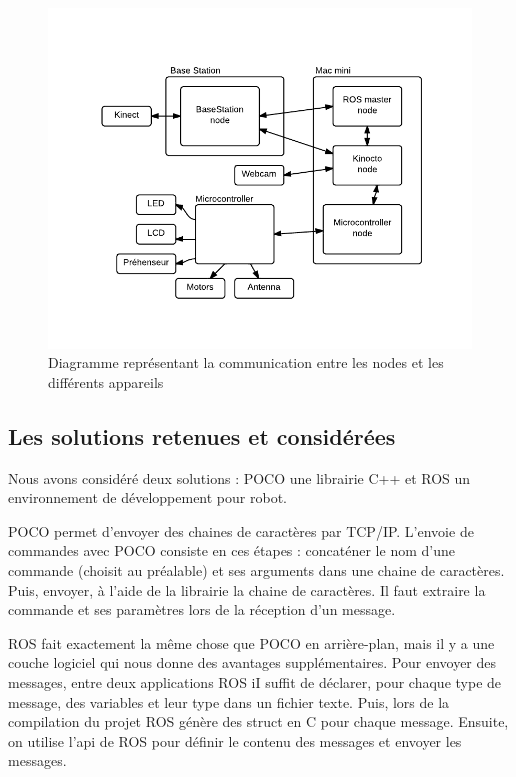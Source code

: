 \begin{figure}[htbp]
\centering
\includegraphics[scale=1]{fig/communicationNodesAppareils.pdf}
\caption{Diagramme représentant la communication entre les nodes et les différents appareils}
\label{fig:commNodes}
\end{figure}

\subsection{Les solutions retenues et considérées}
Nous avons considéré deux solutions : POCO une librairie C++ et ROS un environnement de développement pour robot.

POCO permet d’envoyer des chaines de caractères par TCP/IP. L’envoie de commandes avec POCO consiste en ces étapes : concaténer le nom d’une commande (choisit au préalable) et ses arguments dans une chaine de caractères. Puis, envoyer, à l’aide de la librairie la chaine de caractères. Il faut extraire la commande et ses paramètres lors de la réception d’un message.

ROS fait exactement la même chose que POCO en arrière-plan, mais il y a une couche logiciel qui nous donne des avantages supplémentaires. Pour envoyer des messages, entre deux applications ROS iI suffit de déclarer, pour chaque type de message, des variables et leur type dans un fichier texte. Puis, lors de la compilation du projet ROS génère des struct en C pour chaque message. Ensuite, on utilise l’api de ROS pour définir le contenu des messages et envoyer les messages.

